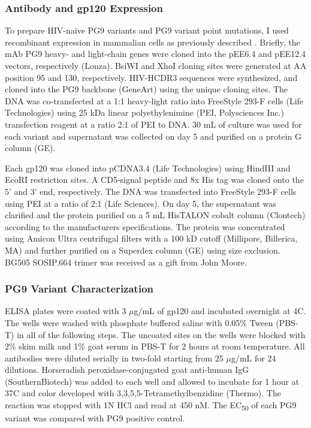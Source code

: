 \subsubsection{Antibody and gp120 Expression}
To prepare HIV-naïve PG9 variants and PG9 variant point mutations, I used recombinant expression in mammalian cells as previously described \citep{Xu:2010da}. Briefly, the mAb PG9 heavy- and light-chain genes were cloned into the pEE6.4 and pEE12.4 vectors, respectively (Lonza). BsiWI and XhoI cloning sites were generated at AA position 95 and 130, respectively. HIV-\naive HCDR3 sequences were synthesized, and cloned into the PG9 backbone (GeneArt) using the unique cloning sites. The DNA was co-transfected at a 1:1 heavy-light ratio into FreeStyle 293-F cells (Life Technologies) using 25 kDa linear polyethylenimine (PEI, Polysciences Inc.) transfection reagent at a ratio 2:1 of PEI to DNA. 30 mL of culture was used for each variant and supernatant was collected on day 5 and purified on a protein G column (GE).

Each gp120 was cloned into pCDNA3.4 (Life Technologies) using HindIII and EcoRI restriction sites. A CD5-signal peptide and 8x His tag was cloned onto the 5' and 3' end, respectively. The DNA was transfected into FreeStyle 293-F cells using PEI at a ratio of 2:1 (Life Sciences). On day 5, the supernatant was clarified and the protein purified on a 5 mL HisTALON cobalt column (Clontech) according to the manufacturers specifications. The protein was concentrated using Amicon Ultra centrifugal filters with a 100 kD cutoff (Millipore, Billerica, MA) and further purified on a Superdex column (GE) using size exclusion. BG505 SOSIP.664 trimer was received as a gift from John Moore.

\subsubsection{PG9 Variant Characterization}
ELISA plates were coated with 3 $\mu$g/mL of gp120 and incubated overnight at 4\degree C. The wells were washed with phosphate buffered saline with 0.05\% Tween (PBS-T) in all of the following steps. The uncoated sites on the wells were blocked with 2\% skim milk and 1\% goat serum in PBS-T for 2 hours at room temperature.  All antibodies were diluted serially in two-fold starting from 25 $\mu$g/mL for 24 dilutions. Horseradish peroxidase-conjugated goat anti‑human IgG (SouthernBiotech) was added to each well and allowed to incubate for 1 hour at 37\degree C and color developed with 3,3,5,5-Tetramethylbenzidine (Thermo). The reaction was stopped with 1N HCl and read at 450 nM. The EC\textsubscript{50} of each PG9 variant was compared with PG9 positive control.

